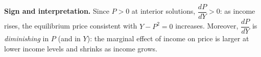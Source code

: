 \documentclass[12pt]{article}
\begin{document}
\textbf{Sign and interpretation.} Since $P>0$ at interior solutions, $\dfrac{dP}{dY}>0$: as income rises, the equilibrium price consistent with $Y-P^2=0$ increases. Moreover, $\dfrac{dP}{dY}$ is \emph{diminishing} in $P$ (and in $Y$): the marginal effect of income on price is larger at lower income levels and shrinks as income grows.

\bigskip

\end{document}
